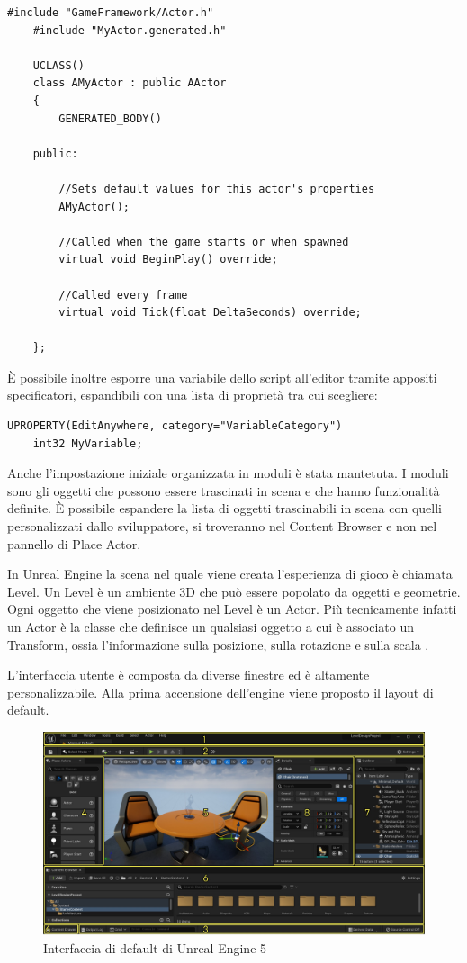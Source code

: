 \begin{lstlisting}[caption = File header generato alla creazione di un Actor]
    #include "GameFramework/Actor.h"
    #include "MyActor.generated.h"

    UCLASS()
    class AMyActor : public AActor
    {
        GENERATED_BODY()

    public:

        //Sets default values for this actor's properties
        AMyActor();

        //Called when the game starts or when spawned
        virtual void BeginPlay() override;

        //Called every frame
        virtual void Tick(float DeltaSeconds) override;

    };
\end{lstlisting}

È possibile inoltre esporre una variabile dello script all'editor tramite appositi specificatori, espandibili con una lista di proprietà tra cui scegliere:

\begin{lstlisting}[caption = Specificatore UPROPERTY per esporre una variabile all'editor]
    UPROPERTY(EditAnywhere, category="VariableCategory")
    int32 MyVariable;
\end{lstlisting}

Anche l'impostazione iniziale organizzata in moduli è stata mantetuta.
%
I moduli sono gli oggetti che possono essere trascinati in scena e che hanno funzionalità definite.
%
È possibile espandere la lista di oggetti trascinabili in scena con quelli personalizzati dallo sviluppatore, si troveranno nel Content Browser e non nel pannello di Place Actor.

In Unreal Engine la scena nel quale viene creata l'esperienza di gioco è chiamata Level.
%
Un Level è un ambiente 3D che può essere popolato da oggetti e geometrie.
%
Ogni oggetto che viene posizionato nel Level è un Actor.
%
Più tecnicamente infatti un Actor è la classe che definisce un qualsiasi oggetto a cui è associato un Transform, ossia l'informazione sulla posizione, sulla rotazione e sulla scala \cite{ULevelEditor}.

L'interfaccia utente è composta da diverse finestre ed è altamente personalizzabile.
%
Alla prima accensione dell'engine viene proposto il layout di default.

\begin{figure}[h!]
    \centering
    \includegraphics[height=6cm]{figure/02-default-interface-windows.jpg}
    \caption{Interfaccia di default di Unreal Engine 5}
\end{figure}

